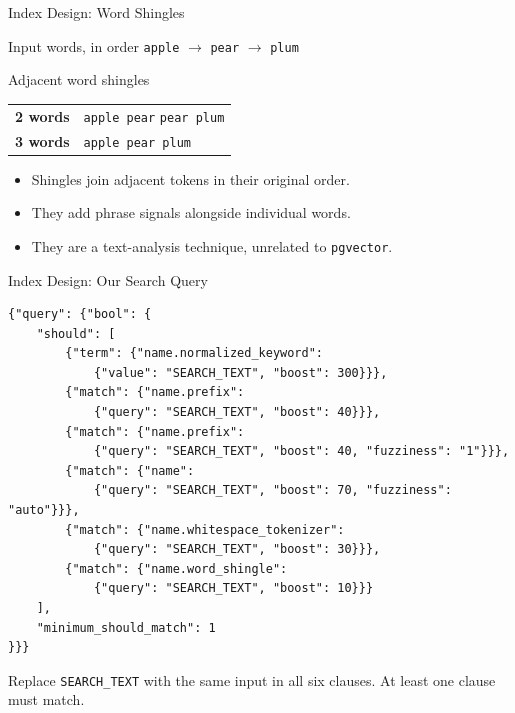 \documentclass[aspectratio=169]{beamer}
\begin{document}
\begin{frame}{Index Design: Word Shingles}
  \begin{exampleblock}{Input words, in order}
    \centering
    \texttt{apple} $\to$ \texttt{pear} $\to$ \texttt{plum}
  \end{exampleblock}
  \begin{block}{Adjacent word shingles}
    \begin{tabular}{@{}ll@{}}
      \textbf{2 words} & \texttt{apple pear} \qquad \texttt{pear plum} \\[0.2cm]
      \textbf{3 words} & \texttt{apple pear plum}
    \end{tabular}
  \end{block}
  \begin{itemize}
    \item Shingles join adjacent tokens in their original order.
    \item They add phrase signals alongside individual words.
    \item They are a text-analysis technique, unrelated to \texttt{pgvector}.
  \end{itemize}
\end{frame}

\begin{frame}[fragile]{Index Design: Our Search Query}
  \scriptsize
\begin{verbatim}
{"query": {"bool": {
    "should": [
        {"term": {"name.normalized_keyword":
            {"value": "SEARCH_TEXT", "boost": 300}}},
        {"match": {"name.prefix":
            {"query": "SEARCH_TEXT", "boost": 40}}},
        {"match": {"name.prefix":
            {"query": "SEARCH_TEXT", "boost": 40, "fuzziness": "1"}}},
        {"match": {"name":
            {"query": "SEARCH_TEXT", "boost": 70, "fuzziness": "auto"}}},
        {"match": {"name.whitespace_tokenizer":
            {"query": "SEARCH_TEXT", "boost": 30}}},
        {"match": {"name.word_shingle":
            {"query": "SEARCH_TEXT", "boost": 10}}}
    ],
    "minimum_should_match": 1
}}}
\end{verbatim}
  \small Replace \texttt{SEARCH\_TEXT} with the same input in all six clauses. At least one clause must match.
\end{frame}
\end{document}
